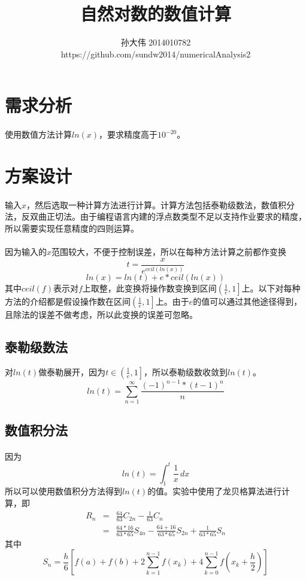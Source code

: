 \documentclass[UTF8,twocolum,titlepage]{ctexart}
\title{自然对数的数值计算}
\author{孙大伟 2014010782\\https://github.com/sundw2014/numericalAnalysis2}
\date{}
\begin{document}
\maketitle
\boldmath
\section*{需求分析}
\paragraph{}
使用数值方法计算$ln\left(x\right)$，要求精度高于$10^{-20}$。
\section*{方案设计}
\paragraph{}
输入$x$，然后选取一种计算方法进行计算。计算方法包括泰勒级数法，数值积分法，反双曲正切法。由于编程语言内建的浮点数类型不足以支持作业要求的精度，所以需要实现任意精度的四则运算。
\paragraph{}
因为输入的$x$范围较大，不便于控制误差，所以在每种方法计算之前都作变换$$t=\frac{x}{e^{ceil\left(ln\left(x\right)\right)}}$$ $$ln\left(x\right)=ln\left(t\right)+e*ceil\left(ln\left(x\right)\right)$$其中$ceil\left(f\right)$表示对$f$上取整，此变换将操作数变换到区间$\left(\frac{1}{e},1 \right]$上。以下对每种方法的介绍都是假设操作数在区间$\left(\frac{1}{e},1 \right]$上。由于$e$的值可以通过其他途径得到，且除法的误差不做考虑，所以此变换的误差可忽略。
\subsection*{泰勒级数法}
对$ln\left(t\right)$做泰勒展开，因为$t\in\left(\frac{1}{e},1 \right]$，所以泰勒级数收敛到$ln\left(t\right)$。
$$ln\left(t\right)=\sum\limits_{n=1}^{\infty}\frac{\left(-1\right)^{n-1}*\left(t-1\right)^{n}}{n}$$
\subsection*{数值积分法}
\paragraph{}
因为$$ln\left(t\right)=\int_1^t \frac{1}{x}\,dx$$所以可以使用数值积分方法得到$ln\left(t\right)$的值。实验中使用了龙贝格算法进行计算，即
\begin{eqnarray*}
R_n&=&\frac{64}{63}C_{2n}-\frac{1}{63}C_{n}\\
&=&\frac{64*16}{63*65}S_{4n}-\frac{64+16}{63*65}S_{2n}+\frac{1}{63*65}S_{n}
\end{eqnarray*}
其中
$$S_n=\frac{h}{6}\left[f(a)+f(b)+2\sum_{k=1}^{n-1}f(x_{k})+4\sum_{k=0}^{n-1}f(x_{k}+\frac{h}{2})\right]$$
\end{document}
